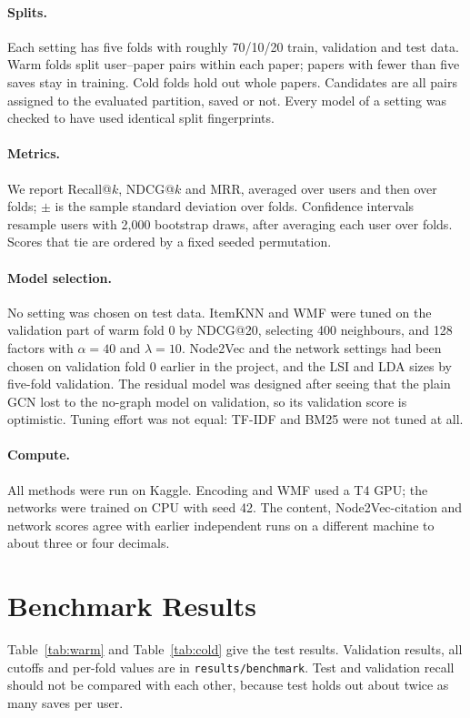 \documentclass[10pt]{article}
\begin{document}
\paragraph{Splits.} Each setting has five folds with roughly 70/10/20 train, validation and test data. Warm folds split user--paper pairs within each paper; papers with fewer than five saves stay in training. Cold folds hold out whole papers. Candidates are all pairs assigned to the evaluated partition, saved or not. Every model of a setting was checked to have used identical split fingerprints.

\paragraph{Metrics.} We report Recall@$k$, NDCG@$k$ and MRR, averaged over users and then over folds; $\pm$ is the sample standard deviation over folds. Confidence intervals resample users with 2,000 bootstrap draws, after averaging each user over folds. Scores that tie are ordered by a fixed seeded permutation.

\paragraph{Model selection.} No setting was chosen on test data. ItemKNN and WMF were tuned on the validation part of warm fold 0 by NDCG@20, selecting 400 neighbours, and 128 factors with $\alpha=40$ and $\lambda=10$. Node2Vec and the network settings had been chosen on validation fold 0 earlier in the project, and the LSI and LDA sizes by five-fold validation. The residual model was designed after seeing that the plain GCN lost to the no-graph model on validation, so its validation score is optimistic. Tuning effort was not equal: TF-IDF and BM25 were not tuned at all.

\paragraph{Compute.} All methods were run on Kaggle. Encoding and WMF used a T4 GPU; the networks were trained on CPU with seed 42. The content, Node2Vec-citation and network scores agree with earlier independent runs on a different machine to about three or four decimals.

\section{Benchmark Results}
Table~\ref{tab:warm} and Table~\ref{tab:cold} give the test results. Validation results, all cutoffs and per-fold values are in \texttt{results/benchmark}. Test and validation recall should not be compared with each other, because test holds out about twice as many saves per user.
\end{document}

